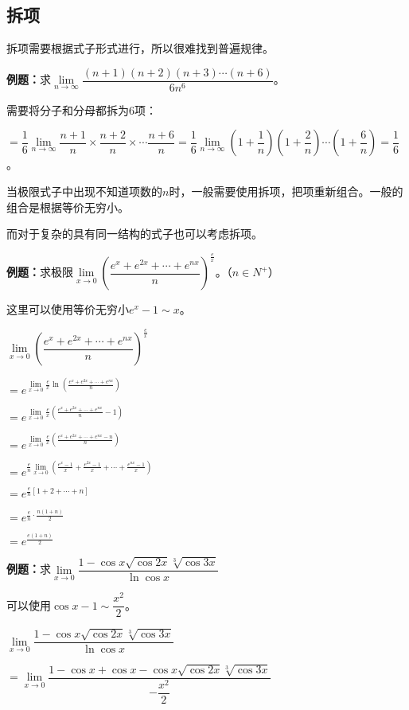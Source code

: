 \documentclass[UTF8, 12pt]{ctexart}
\begin{document}
\subsection{拆项}

拆项需要根据式子形式进行，所以很难找到普遍规律。

\textbf{例题：}求$\lim\limits_{n\to\infty}\dfrac{(n+1)(n+2)(n+3)\cdots(n+6)}{6n^6}$。

需要将分子和分母都拆为6项：

$=\dfrac{1}{6}\lim\limits_{n\to\infty}\dfrac{n+1}{n}\times\dfrac{n+2}{n}\times\cdots\dfrac{n+6}{n}=\dfrac{1}{6}\lim\limits_{n\to\infty}(1+\dfrac{1}{n})(1+\dfrac{2}{n})\cdots(1+\dfrac{6}{n})=\dfrac{1}{6}$。

当极限式子中出现不知道项数的$n$时，一般需要使用拆项，把项重新组合。一般的组合是根据等价无穷小。

而对于复杂的具有同一结构的式子也可以考虑拆项。

\textbf{例题：}求极限$\lim\limits_{x\to 0}\left(\dfrac{e^x+e^{2x}+\cdots+e^{nx}}{n}\right)^{\frac{e}{x}}$。（$n\in N^+$）

这里可以使用等价无穷小$e^x-1\sim x$。

$\lim\limits_{x\to 0}\left(\dfrac{e^x+e^{2x}+\cdots+e^{nx}}{n}\right)^{\frac{e}{x}}$

$=e^{\lim\limits_{x\to 0}\frac{e}{x}\ln\left(\frac{e^x+e^{2x}+\cdots+e^{nx}}{n}\right)}$

$=e^{\lim\limits_{x\to 0}\frac{e}{x}\left(\frac{e^x+e^{2x}+\cdots+e^{nx}}{n}-1\right)}$

$=e^{\lim\limits_{x\to 0}\frac{e}{x}\left(\frac{e^x+e^{2x}+\cdots+e^{nx}-n}{n}\right)}$

$=e^{\frac{e}{n}\lim\limits_{x\to 0}\left(\frac{e^x-1}{x}+\frac{e^{2x}-1}{x}+\cdots+\frac{e^{nx}-1}{x}\right)}$

$=e^{\frac{e}{n}[1+2+\cdots+n]}$

$=e^{\frac{e}{n}\cdot\frac{n(1+n)}{2}}$

$=e^{\frac{e(1+n)}{2}}$

\textbf{例题：}求$\lim\limits_{x\to 0}\dfrac{1-\cos x\sqrt{\cos 2x}\sqrt[3]{\cos 3x}}{\ln\cos x}$\medskip

可以使用$\cos x-1\sim\dfrac{x^2}{2}$。\medskip

$\lim\limits_{x\to 0}\dfrac{1-\cos x\sqrt{\cos 2x}\sqrt[3]{\cos 3x}}{\ln\cos x}$

$=\lim\limits_{x\to 0}\dfrac{1-\cos x+\cos x-\cos x\sqrt{\cos 2x}\sqrt[3]{\cos 3x}}{-\dfrac{x^2}{2}}$
\end{document}
